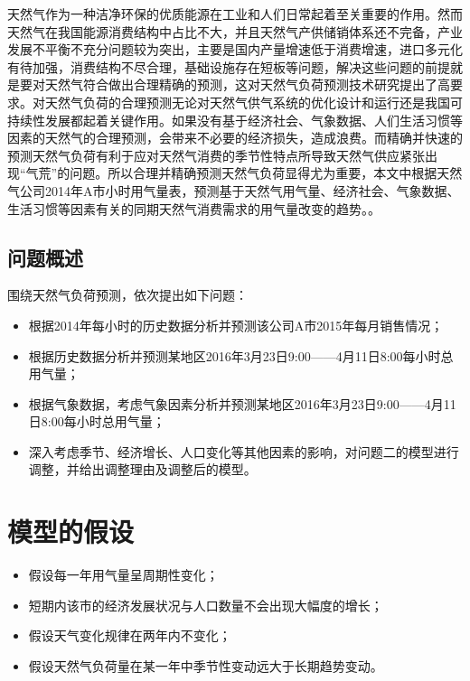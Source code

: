 \documentclass{whutmod}
\begin{document}
		天然气作为一种洁净环保的优质能源在工业和人们日常起着至关重要的作用。然而天然气在我国能源消费结构中占比不大，并且天然气产供储销体系还不完备，产业发展不平衡不充分问题较为突出，主要是国内产量增速低于消费增速，进口多元化有待加强，消费结构不尽合理，基础设施存在短板等问题，解决这些问题的前提就是要对天然气符合做出合理精确的预测，这对天然气负荷预测技术研究提出了高要求。对天然气负荷的合理预测无论对天然气供气系统的优化设计和运行还是我国可持续性发展都起着关键作用。如果没有基于经济社会、气象数据、人们生活习惯等因素的天然气的合理预测，会带来不必要的经济损失，造成浪费。而精确并快速的预测天然气负荷有利于应对天然气消费的季节性特点所导致天然气供应紧张出现“气荒”的问题\parencite{孙相博2019基于改进灰色}。所以合理并精确预测天然气负荷显得尤为重要，本文中根据天然气公司2014年A市小时用气量表，预测基于天然气用气量、经济社会、气象数据、生活习惯等因素有关的同期天然气消费需求的用气量改变的趋势。。
	
	\subsection{问题概述}
	
	围绕天然气负荷预测，依次提出如下问题：
	
	\begin{itemize}
		\item 根据2014年每小时的历史数据分析并预测该公司A市2015年每月销售情况；
		\item 根据历史数据分析并预测某地区2016年3月23日9:00——4月11日8:00每小时总用气量；
		\item 根据气象数据，考虑气象因素分析并预测某地区2016年3月23日9:00——4月11日8:00每小时总用气量；
		\item 深入考虑季节、经济增长、人口变化等其他因素的影响，对问题二的模型进行调整，并给出调整理由及调整后的模型。
	\end{itemize}
	
	\section{模型的假设}
	\begin{itemize}
		\item 假设每一年用气量呈周期性变化；
		\item 短期内该市的经济发展状况与人口数量不会出现大幅度的增长；
		\item 假设天气变化规律在两年内不变化；
		\item 假设天然气负荷量在某一年中季节性变动远大于长期趋势变动。
	\end{itemize}
	
\end{document}
